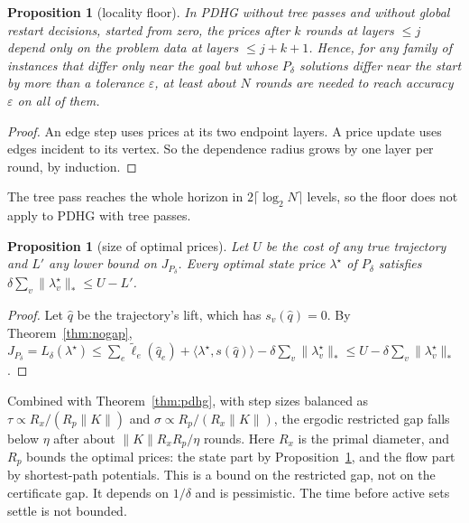 \documentclass[11pt]{article}
\newcommand{\Pd}{P_\delta}
\newcommand{\Jd}{J_{P_\delta}}
\theoremstyle{plain}
\newtheorem{proposition}[theorem]{Proposition}
\theoremstyle{definition}
\theoremstyle{remark}
\begin{document}
\begin{proposition}[locality floor]\label{prop:local}
In PDHG without tree passes and without global restart decisions, started from zero, the prices after $k$ rounds at layers $\le j$ depend only on the problem data at layers $\le j+k+1$. Hence, for any family of instances that differ only near the goal but whose $\Pd$ solutions differ near the start by more than a tolerance $\varepsilon$, at least about $N$ rounds are needed to reach accuracy $\varepsilon$ on all of them.
\end{proposition}
\begin{proof}
An edge step uses prices at its two endpoint layers. A price update uses edges incident to its vertex. So the dependence radius grows by one layer per round, by induction.
\end{proof}
The tree pass reaches the whole horizon in $2\lceil\log_2N\rceil$ levels, so the floor does not apply to PDHG with tree passes.

\begin{proposition}[size of optimal prices]\label{prop:dualsize}
Let $U$ be the cost of any true trajectory and $L'$ any lower bound on $\Jd$. Every optimal state price $\lambda^\star$ of $\Pd$ satisfies $\delta\sum_v\|\lambda^\star_v\|_*\le U-L'$.
\end{proposition}
\begin{proof}
Let $\hat q$ be the trajectory's lift, which has $s_v(\hat q)=0$. By Theorem~\ref{thm:nogap}, $\Jd=L_\delta(\lambda^\star)\le\sum_e\tilde\ell_e(\hat q_e)+\langle\lambda^\star,s(\hat q)\rangle-\delta\sum_v\|\lambda^\star_v\|_*\le U-\delta\sum_v\|\lambda^\star_v\|_*$.
\end{proof}
Combined with Theorem~\ref{thm:pdhg}, with step sizes balanced as $\tau\propto R_x/(R_p\|K\|)$ and $\sigma\propto R_p/(R_x\|K\|)$, the ergodic restricted gap falls below $\eta$ after about $\|K\|R_xR_p/\eta$ rounds. Here $R_x$ is the primal diameter, and $R_p$ bounds the optimal prices: the state part by Proposition~\ref{prop:dualsize}, and the flow part by shortest-path potentials. This is a bound on the restricted gap, not on the certificate gap. It depends on $1/\delta$ and is pessimistic. The time before active sets settle is not bounded.

\end{document}
